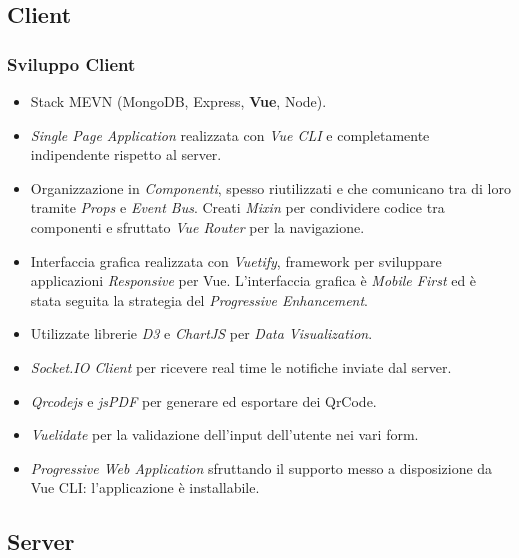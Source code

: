 \documentclass{beamer}
\begin{document}
\subsection{Client}

\begin{frame}
\frametitle{Sviluppo Client}
\begin{itemize}
\item Stack MEVN (MongoDB, Express, \textbf{Vue}, Node).
\item \textit{Single Page Application} realizzata con \textit{Vue CLI} e completamente indipendente rispetto al server.
\item Organizzazione in \textit{Componenti}, spesso riutilizzati e che comunicano tra di loro tramite \textit{Props} e \textit{Event Bus}. Creati \textit{Mixin} per condividere codice tra componenti e sfruttato \textit{Vue Router} per la navigazione.
\item Interfaccia grafica realizzata con \textit{Vuetify}, framework per sviluppare applicazioni \textit{Responsive} per Vue. L'interfaccia grafica è \textit{Mobile First} ed è stata seguita la strategia del \textit{Progressive Enhancement}.
\item Utilizzate librerie \textit{D3} e \textit{ChartJS} per \textit{Data Visualization}.
\item \textit{Socket.IO Client} per ricevere real time le notifiche inviate dal server.
\item \textit{Qrcodejs} e \textit{jsPDF} per generare ed esportare dei QrCode. 
\item \textit{Vuelidate} per la validazione dell'input dell'utente nei vari form.
\item \textit{Progressive Web Application} sfruttando il supporto messo a disposizione da Vue CLI: l'applicazione è installabile.
\end{itemize}
\end{frame}
\subsection{Server}
\end{document}
